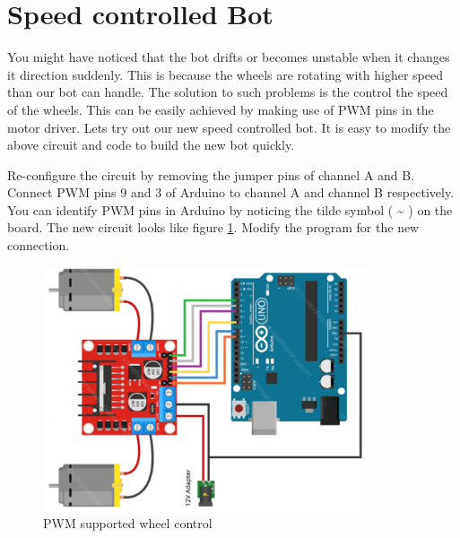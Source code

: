 \section{Speed controlled Bot}

\par You might have noticed that the bot drifts or becomes unstable when it changes it direction suddenly. This is because the wheels are rotating with higher speed than our bot can handle. The solution to such problems is the control the speed of the wheels. This can be easily achieved by making use of \ac{PWM} pins in the motor driver. Lets try out our new speed controlled bot. It is easy to modify the above circuit and code to build the new bot quickly.

\par Re-configure the circuit by removing the jumper pins of channel A and B. Connect \ac{PWM} pins 9 and 3 of Arduino to channel A and channel B respectively. You can identify \ac{PWM} pins in Arduino by noticing the tilde symbol ( \textasciitilde{} ) on the board. The new circuit looks like figure \ref{fig:speed_controlled}. Modify the program for the new connection.

\begin{figure}
    \centering
    \includegraphics[width=3.8in]{Images/Motor_Driver/speed_bot.png}
    \caption{PWM supported wheel control}
    \label{fig:speed_controlled}
\end{figure}

